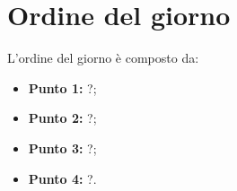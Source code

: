 \section{Ordine del giorno}
L'ordine del giorno è composto da: 
\begin{itemize}
	\item \textbf{Punto 1:} ?;
	\item \textbf{Punto 2:} ?;
	\item \textbf{Punto 3:} ?;
	\item \textbf{Punto 4:} ?.
\end{itemize}

